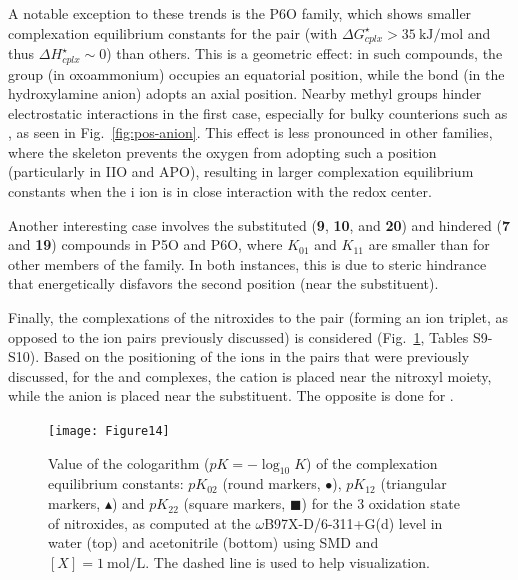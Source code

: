 \documentclass[review,preprint]{elsarticle}
\begin{document}
A notable exception to these trends is the P6O family, which shows smaller complexation equilibrium constants for the  pair (with $\Delta G^\star_{cplx} > \SI{35}{\kilo\joule\per\mole}$ and thus $\Delta H^\star_{cplx} \sim 0$) than others. This is a geometric effect: in such compounds, the  group (in oxoammonium) occupies an equatorial position, while the  bond (in the hydroxylamine anion) adopts an axial position. Nearby methyl groups hinder electrostatic interactions in the first case, especially for bulky counterions such as , as seen in Fig.~\ref{fig:pos-anion}. This effect is less pronounced in other families, where the skeleton prevents the oxygen from adopting such a position (particularly in IIO and APO), resulting in larger complexation equilibrium constants when the i ion is in close interaction with the redox center.

Another interesting case involves the substituted (\textbf{9}, \textbf{10}, and \textbf{20}) and hindered (\textbf{7} and \textbf{19}) compounds in P5O and P6O, where $K_{01}$ and $K_{11}$ are smaller than for other members of the family. In both instances, this is due to steric hindrance that energetically disfavors the second position (near the substituent).

Finally, the complexations of the nitroxides to the  pair (forming an ion triplet, as opposed to the ion pairs previously discussed) is considered (Fig.~\ref{fig:Kx2}, Tables S9-S10). Based on the positioning of the ions in the pairs that were previously discussed, for the  and  complexes, the cation is placed near the nitroxyl moiety, while the anion is placed near the substituent. The opposite is done for . 


\begin{figure}[!h]
\centering
\texttt{[image: Figure14]}
\caption{Value of the cologarithm ($pK = -\log_{10}K$) of the complexation equilibrium constants: $pK_{02}$ (round markers, $\bullet$), $pK_{12}$ (triangular markers, $\blacktriangle$) and $pK_{22}$ (square markers, $\blacksquare$) for the 3 oxidation state of nitroxides, as computed at the $\omega$B97X-D/6-311+G(d) level in water (top) and acetonitrile (bottom) using SMD and $[X]=\SI{1}{\mole\per\liter}$.  The dashed line is used to help visualization. }
\label{fig:Kx2}
\end{figure}
\end{document}
